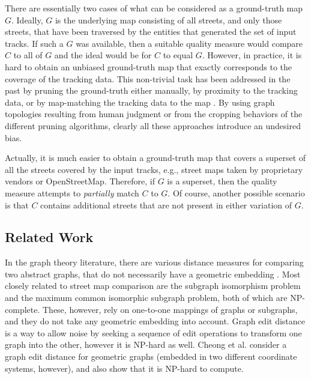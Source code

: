 \documentclass[natbib]{svjour3}                    \smartqed  \usepackage[table]{xcolor}
\begin{document}
There are essentially two cases of what can be considered as a ground-truth map $G$. Ideally, $G$ is the underlying map consisting of all streets, and only those streets, that have been traversed by the entities that generated the set of input tracks. If such a $G$ was available, then a suitable quality measure would compare $C$ to all of $G$ and the ideal would be for $C$ to equal $G$. However, in practice, it is hard to obtain an unbiased ground-truth map that exactly corresponds to the coverage of the tracking data. 
This non-trivial task has been addressed in the past by pruning the ground-truth either manually, by proximity to the tracking data, or by map-matching the tracking data to the map \cite{be-irmgp-12,Biagioni:2012:MIF:2424321.2424333,Karagiorgou:2012:VTD:2424321.2424334,Liu:2012:MLS:2339530.2339637}. By using graph topologies resulting from human judgment or from the cropping behaviors of the different pruning algorithms, clearly all these approaches introduce an undesired bias.

Actually, it is much easier to obtain a ground-truth map that covers a superset of all the streets covered by the input tracks, e.g., street maps taken by proprietary vendors or OpenStreetMap. 
Therefore, if $G$ is a superset, then the quality measure attempts to {\em partially} match $C$ to $G$.
Of course, another possible scenario is that $C$ contains additional streets that are not present in either variation of $G$. 

\subsection{Related Work}
In the graph theory literature, there are various distance measures for comparing two abstract graphs, that do not necessarily have a geometric embedding \cite{cfsv-tygmpr-04,JGT:JGT3190030202,JGT:JGT3190010410}. Most closely related to street map comparison are the subgraph isomorphism problem and the maximum common isomorphic subgraph problem, both of which are NP-complete. These, however, rely on one-to-one mappings of graphs or subgraphs, and they do not take any geometric embedding into account. Graph edit distance \cite{gxtl-sged-10,Zeng:2009:CSA:1687627.1687631} is a way to allow noise by seeking a sequence of edit operations to transform one graph into the other, however it is NP-hard as well. Cheong et al. \cite{CheongGKSS09} consider a graph edit distance for geometric graphs (embedded in two different coordinate systems, however), and also show that it is NP-hard to compute. 
\end{document}

